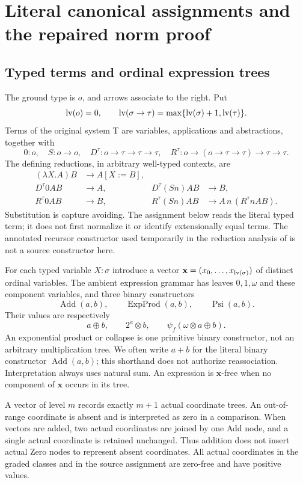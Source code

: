 \section{Literal canonical assignments and the repaired norm proof}
\label{sec:source}

\subsection{Typed terms and ordinal expression trees}

The ground type is $o$, and arrows associate to the right.  Put
\[
 \operatorname{lv}(o)=0,\qquad
 \operatorname{lv}(\sigma\to\tau)=\max\{\operatorname{lv}(\sigma)+1,\operatorname{lv}(\tau)\}.
\]
Terms of the original system T are variables, applications and
abstractions, together with
\[
 0:o,\quad S:o\to o,\quad
 D^\tau:o\to\tau\to\tau\to\tau,\quad
 R^\tau:o\to(o\to\tau\to\tau)\to\tau\to\tau.
\]
The defining reductions, in arbitrary well-typed contexts, are
\begin{align*}
 (\lambda X.A)B&\longrightarrow A[X:=B],\\
 D^\tau0AB&\longrightarrow A,&
 D^\tau(Sn)AB&\longrightarrow B,\\
 R^\tau0AB&\longrightarrow B,&
 R^\tau(Sn)AB&\longrightarrow A\,n\,(R^\tau nAB).
\end{align*}
Substitution is capture avoiding.  The assignment below reads the
literal typed term; it does not first normalize it or identify
extensionally equal terms.  The annotated recursor constructor used
temporarily in the reduction analysis of \cite{ww} is not a source
constructor here.

For each typed variable $X:\sigma$ introduce a vector
$\mathbf x=(x_0,\ldots,x_{\operatorname{lv}(\sigma)})$ of distinct ordinal
variables.  The ambient expression grammar has leaves $0,1,\omega$
and these component variables, and three binary constructors
\[
 \operatorname{Add}(a,b),\qquad
 \operatorname{ExpProd}(a,b),\qquad
 \operatorname{Psi}(a,b).
\]
Their values are respectively
\[
 a\oplus b,\qquad 2^a\otimes b,\qquad
 \psi_f(\omega\otimes a\oplus b).
\]
An exponential product or collapse is one primitive binary constructor,
not an arbitrary multiplication tree.  We often write $a+b$ for the
literal binary constructor $\operatorname{Add}(a,b)$; this shorthand
does not authorize reassociation.  Interpretation always uses natural
sum.  An expression is $\mathbf x$-free when no component of
$\mathbf x$ occurs in its tree.

A vector of level $m$ records exactly $m+1$ actual coordinate trees.
An out-of-range coordinate is absent and is interpreted as zero in a
comparison.  When vectors are added, two actual coordinates are joined
by one Add node, and a single actual coordinate is retained unchanged.
Thus addition does not insert actual Zero nodes to represent absent
coordinates.  All actual coordinates in the graded classes and in the
source assignment are zero-free and have positive values.

